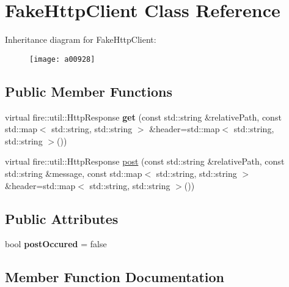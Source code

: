 \hypertarget{a00928}{}\section{Fake\+Http\+Client Class Reference}
\label{a00928}
Inheritance diagram for Fake\+Http\+Client\+:\begin{figure}[H]
\begin{center}
\leavevmode
\texttt{[image: a00928]}
\end{center}
\end{figure}
\subsection*{Public Member Functions}
\begin{DoxyCompactItemize}
\item 
\mbox{\label{a00928_aa69081dbfa2351dbc9d01434df577568}} 
virtual fire\+::util\+::\+Http\+Response {\bfseries get} (const std\+::string \&relative\+Path, const std\+::map$<$ std\+::string, std\+::string $>$ \&header=std\+::map$<$ std\+::string, std\+::string $>$())
\item 
virtual fire\+::util\+::\+Http\+Response \hyperlink{a00928_af775ada9f2a4e0939f06b733acb5e8ed}{post} (const std\+::string \&relative\+Path, const std\+::string \&message, const std\+::map$<$ std\+::string, std\+::string $>$ \&header=std\+::map$<$ std\+::string, std\+::string $>$())
\end{DoxyCompactItemize}
\subsection*{Public Attributes}
\begin{DoxyCompactItemize}
\item 
\mbox{\label{a00928_aa4f56c4906c5c5654f05778b97860441}} 
bool {\bfseries post\+Occured} = false
\end{DoxyCompactItemize}


\subsection{Member Function Documentation}
\mbox{\label{a00928_af775ada9f2a4e0939f06b733acb5e8ed}} 
